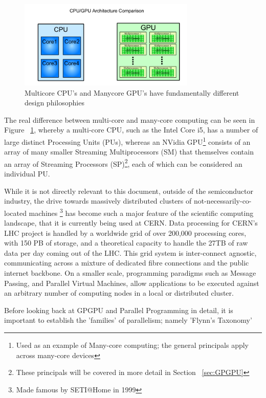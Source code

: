 \begin{figure}[h!]
  \centering
  \includegraphics[width=0.75\textwidth,keepaspectratio=true]{images/cpu_vs_gpu.png}
  \caption{Multicore CPU's and Manycore GPU's have fundamentally different design philosophies}
  \label{fig:CPUvsGPU}
\end{figure}

The real difference between multi-core and many-core computing can be seen in Figure ~\ref{fig:CPUvsGPU}, whereby a multi-core CPU, such as the Intel Core i5, has a number of large distinct Processing Units (PUs), whereas an NVidia GPU\footnote{Used as an example of Many-core computing; the general principals apply across many-core devices} consists of an array of many smaller Streaming Multiprocessors (SM) that themselves contain an array of Streaming Processors (SP)\footnote{These principals will be covered in more detail in Section ~\ref{sec:GPGPU}}, each of which can be considered an individual PU.

While it is not directly relevant to this document, outside of the semiconductor industry, the drive towards massively distributed clusters of not-necessarily-co-located machines \footnote{Made famous by SETI@Home in 1999} has become such a major feature of the scientific computing landscape, that it is currently being used at CERN. Data processing for CERN's LHC project is handled by a worldwide grid of over 200,000 processing cores, with 150 PB of storage, and a theoretical capacity to handle the 27TB of raw data per day coming out of the LHC. This grid system is inter-connect agnostic, communicating across a mixture of dedicated fibre connections and the public internet backbone. On a smaller scale, programming paradigms such as Message Passing, and Parallel Virtual Machines, allow applications to be executed against an arbitrary number of computing nodes in a local or distributed cluster.

Before looking back at GPGPU and Parallel Programming in detail, it is important to establish the 'families' of parallelism; namely 'Flynn's Taxonomy'

